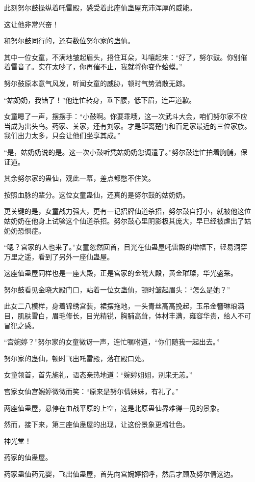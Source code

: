 \begin{this_body}
此刻努尔鼓操纵着吒雷殿，感受着此座仙蛊屋充沛浑厚的威能。

这让他非常兴奋！

和努尔鼓同行的，还有数位努尔家的蛊仙。

其中一位女童，不满地皱起眉头，捂住耳朵，叫嚷起来：“好了，努尔鼓。你别催着雷音了。实在太吵了，你再催不止，我就将你变作蛤蟆。”

努尔鼓原本意气风发，听闻女童的威胁，顿时气势消散无踪。

“姑奶奶，我错了！”他连忙转身，垂下腰，低下眉，连声道歉。

女童嗯了一声，摆摆手：“小鼓啊。你要乖哦，这一次武斗大会，咱们努尔家不应当成为出头鸟。药家、关家，还有刘家。才是距离楚门和百足家最近的三位家族。我们出力太多，只会让他们坐享其成。”

“是，姑奶奶说的是。这一次小鼓听凭姑奶奶您调遣了。”努尔鼓连忙拍着胸脯，保证道。

其余努尔家的蛊仙，观此一幕，差点都憋不住笑。

按照血脉的辈分。这位女童蛊仙，还真的是努尔鼓的姑奶奶。

更关键的是，女童战力强大，更有一记招牌仙道杀招，努尔鼓自打小，就被他这位姑奶奶在他身上试验这个仙道杀招。努尔鼓心里阴影极其庞大，早已经被虐出了姑奶奶恐惧症。

“嗯？宫家的人也来了。”女童忽然回首，目光在仙蛊屋吒雷殿的增幅下，轻易洞穿万里之遥，看到了另外一座仙蛊屋。

这座仙蛊屋同样也是一座大殿，正是宫家的金晓大殿，黄金璀璨，华光盛采。

努尔鼓看见金晓大殿门口，站着一位女蛊仙，顿时皱起眉头：“怎么是她？”

此女二八模样，身着锦绣宫装，裙摆拖地，一头青丝高高挽起，玉吊金簪琳琅满目，肌肤雪白，眉毛修长，目光精锐，胸脯高耸，体材丰满，雍容华贵，给人不可冒犯之感。

“宫婉婷？”努尔家的女童微讶一声，连忙嘱咐道，“你们随我一起出去。”

努尔家的蛊仙，顿时飞出吒雷殿，落在殿口处。

女童领首，首先施礼，语态亲热地道：“婉婷姐姐，别来无恙。”

宫家女仙宫婉婷微微而笑：“原来是努尔倩妹妹，有礼了。”

两座仙蛊屋，悬停在血战平原的上空，这是北原蛊仙界难得一见的景象。

然而，接下来，第三座仙蛊屋的出现，让这份景象更增壮色。

神光堂！

药家的仙蛊屋。

药家蛊仙药元婴，飞出仙蛊屋，首先向宫婉婷招呼，然后才顾及努尔倩这边。


\end{this_body}
